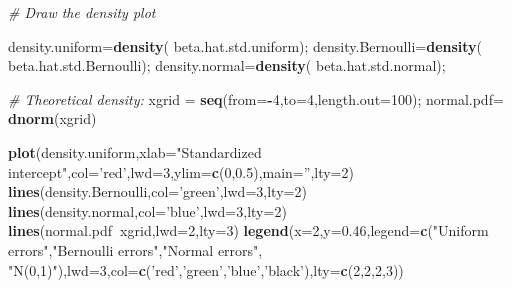 \documentclass[12pt,]{book}
\newenvironment{Shaded}{\begin{snugshade}}{\end{snugshade}}
\newcommand{\KeywordTok}[1]{\textcolor[rgb]{0.13,0.29,0.53}{\textbf{#1}}}
\newcommand{\DataTypeTok}[1]{\textcolor[rgb]{0.13,0.29,0.53}{#1}}
\newcommand{\DecValTok}[1]{\textcolor[rgb]{0.00,0.00,0.81}{#1}}
\newcommand{\FloatTok}[1]{\textcolor[rgb]{0.00,0.00,0.81}{#1}}
\newcommand{\StringTok}[1]{\textcolor[rgb]{0.31,0.60,0.02}{#1}}
\newcommand{\CommentTok}[1]{\textcolor[rgb]{0.56,0.35,0.01}{\textit{#1}}}
\newcommand{\OperatorTok}[1]{\textcolor[rgb]{0.81,0.36,0.00}{\textbf{#1}}}
\newcommand{\NormalTok}[1]{#1}
\begin{document}
\begin{Shaded}
\begin{Highlighting}[]
\CommentTok{# Draw the density plot}

\NormalTok{density.uniform=}\KeywordTok{density}\NormalTok{( beta.hat.std.uniform);}
\NormalTok{density.Bernoulli=}\KeywordTok{density}\NormalTok{( beta.hat.std.Bernoulli);}
\NormalTok{density.normal=}\KeywordTok{density}\NormalTok{( beta.hat.std.normal);}

\CommentTok{# Theoretical density:}
\NormalTok{xgrid =}\StringTok{ }\KeywordTok{seq}\NormalTok{(}\DataTypeTok{from=}\OperatorTok{-}\DecValTok{4}\NormalTok{,}\DataTypeTok{to=}\DecValTok{4}\NormalTok{,}\DataTypeTok{length.out=}\DecValTok{100}\NormalTok{);}
\NormalTok{normal.pdf=}\StringTok{ }\KeywordTok{dnorm}\NormalTok{(xgrid)}

\KeywordTok{plot}\NormalTok{(density.uniform,}\DataTypeTok{xlab=}\StringTok{"Standardized intercept"}\NormalTok{,}\DataTypeTok{col=}\StringTok{'red'}\NormalTok{,}\DataTypeTok{lwd=}\DecValTok{3}\NormalTok{,}\DataTypeTok{ylim=}\KeywordTok{c}\NormalTok{(}\DecValTok{0}\NormalTok{,}\FloatTok{0.5}\NormalTok{),}\DataTypeTok{main=}\StringTok{''}\NormalTok{,}\DataTypeTok{lty=}\DecValTok{2}\NormalTok{)}
\KeywordTok{lines}\NormalTok{(density.Bernoulli,}\DataTypeTok{col=}\StringTok{'green'}\NormalTok{,}\DataTypeTok{lwd=}\DecValTok{3}\NormalTok{,}\DataTypeTok{lty=}\DecValTok{2}\NormalTok{)}
\KeywordTok{lines}\NormalTok{(density.normal,}\DataTypeTok{col=}\StringTok{'blue'}\NormalTok{,}\DataTypeTok{lwd=}\DecValTok{3}\NormalTok{,}\DataTypeTok{lty=}\DecValTok{2}\NormalTok{)}
\KeywordTok{lines}\NormalTok{(normal.pdf}\OperatorTok{~}\NormalTok{xgrid,}\DataTypeTok{lwd=}\DecValTok{2}\NormalTok{,}\DataTypeTok{lty=}\DecValTok{3}\NormalTok{)}
\KeywordTok{legend}\NormalTok{(}\DataTypeTok{x=}\DecValTok{2}\NormalTok{,}\DataTypeTok{y=}\FloatTok{0.46}\NormalTok{,}\DataTypeTok{legend=}\KeywordTok{c}\NormalTok{(}\StringTok{"Uniform errors"}\NormalTok{,}\StringTok{"Bernoulli errors"}\NormalTok{,}\StringTok{"Normal errors"}\NormalTok{, }\StringTok{"N(0,1)"}\NormalTok{),}\DataTypeTok{lwd=}\DecValTok{3}\NormalTok{,}\DataTypeTok{col=}\KeywordTok{c}\NormalTok{(}\StringTok{'red'}\NormalTok{,}\StringTok{'green'}\NormalTok{,}\StringTok{'blue'}\NormalTok{,}\StringTok{'black'}\NormalTok{),}\DataTypeTok{lty=}\KeywordTok{c}\NormalTok{(}\DecValTok{2}\NormalTok{,}\DecValTok{2}\NormalTok{,}\DecValTok{2}\NormalTok{,}\DecValTok{3}\NormalTok{))}
\end{Highlighting}
\end{Shaded}
\end{document}
